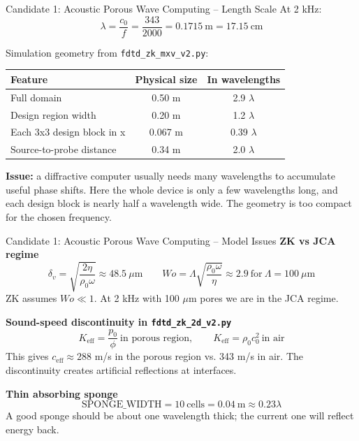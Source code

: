 \documentclass[aspectratio=169,11pt]{beamer}
\begin{document}
\begin{frame}{Candidate 1: Acoustic Porous Wave Computing -- Length Scale}
  \small
  At 2 kHz:
  \[
    \lambda = \frac{c_0}{f} = \frac{343}{2000} = 0.1715\ \text{m} = 17.15\ \text{cm}
  \]

  Simulation geometry from \texttt{fdtd\_zk\_mxv\_v2.py}:
  \begin{center}
    \footnotesize
    \begin{tabular}{lcc}
      \toprule
      Feature & Physical size & In wavelengths \\
      \midrule
      Full domain & 0.50 m & 2.9 $\lambda$ \\
      Design region width & 0.20 m & 1.2 $\lambda$ \\
      Each 3x3 design block in x & 0.067 m & 0.39 $\lambda$ \\
      Source-to-probe distance & 0.34 m & 2.0 $\lambda$ \\
      \bottomrule
    \end{tabular}
  \end{center}

  \vspace{0.1cm}
  \textbf{Issue:} a diffractive computer usually needs many wavelengths to accumulate useful phase shifts. Here the whole device is only a few wavelengths long, and each design block is nearly half a wavelength wide. The geometry is too compact for the chosen frequency.
\end{frame}

\begin{frame}{Candidate 1: Acoustic Porous Wave Computing -- Model Issues}
  \small
  \textbf{ZK vs JCA regime}
  \[
    \delta_v = \sqrt{\frac{2\eta}{\rho_0 \omega}} \approx 48.5\ \mu\text{m}
    \qquad
    Wo = \Lambda \sqrt{\frac{\rho_0 \omega}{\eta}} \approx 2.9\ \text{for}\ \Lambda = 100\ \mu\text{m}
  \]
  ZK assumes $Wo \ll 1$. At 2 kHz with 100 $\mu$m pores we are in the JCA regime.

  \vspace{0.15cm}
  \textbf{Sound-speed discontinuity in \texttt{fdtd\_zk\_2d\_v2.py}}
  \[
    K_{\text{eff}} = \frac{p_0}{\phi}\ \text{in porous region},
    \qquad
    K_{\text{eff}} = \rho_0 c_0^2\ \text{in air}
  \]
  This gives $c_{\text{eff}} \approx 288$ m/s in the porous region vs. 343 m/s in air. The discontinuity creates artificial reflections at interfaces.

  \vspace{0.15cm}
  \textbf{Thin absorbing sponge}
  \[
    \text{SPONGE\_WIDTH} = 10\ \text{cells} = 0.04\ \text{m} \approx 0.23\lambda
  \]
  A good sponge should be about one wavelength thick; the current one will reflect energy back.
\end{frame}
\end{document}
